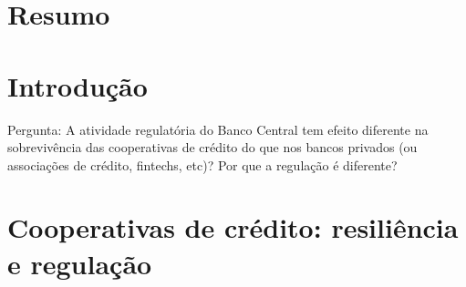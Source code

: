 \documentclass[ppgcc]{fearp}
\begin{document}




\phantom{x}
\tableofcontents*
\cleardoublepage

\mainmatter 
\pagestyle{meuestilo}



\chapter*{Resumo}



\chapter*{Introdução}

Pergunta: A atividade regulatória do Banco Central tem efeito diferente na sobrevivência das cooperativas de crédito do que nos bancos privados (ou associações de crédito, fintechs, etc)? Por que a regulação é diferente?


\chapter{Cooperativas de crédito: resiliência e regulação}
\end{document}
